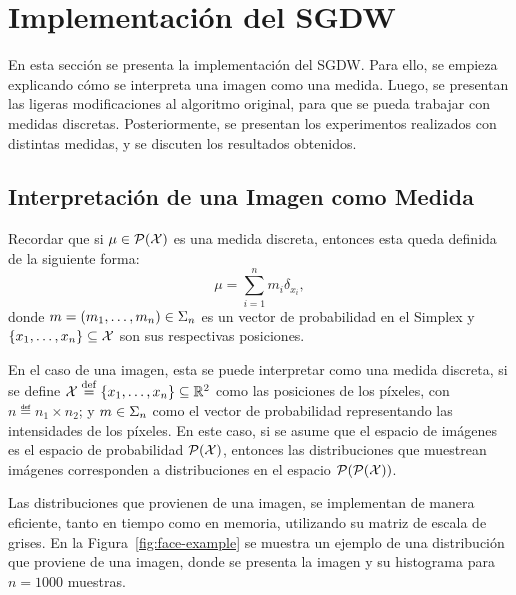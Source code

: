 \section{Implementación del SGDW}\label{sec:sgdw}  %

En esta sección se presenta la implementación del SGDW. Para ello, se empieza explicando cómo se interpreta una imagen como una medida. Luego, se presentan las ligeras modificaciones al algoritmo original, para que se pueda trabajar con medidas discretas. Posteriormente, se presentan los experimentos realizados con distintas medidas, y se discuten los resultados obtenidos.

\subsection{Interpretación de una Imagen como Medida}\label{ssec:interpr-imagen-medida}  %

Recordar que si $\mu\in \ProbSpace[\cX] $ es una medida discreta, entonces esta queda definida de la siguiente forma:
\begin{equation}\label{eq:medida-discreta}
    \mu = \sum_{i=1}^{n} m_i \delta_{x_i},
\end{equation}
donde $m = (m_1, \dots, m_n) \in \Simplex[n]$ es un vector de probabilidad en el Simplex y $ \left\{ x_1, \dots, x_n \right\} \subseteq \cX $ son sus respectivas posiciones.

En el caso de una imagen, esta se puede interpretar como una medida discreta, si se define $\cX \eqdef \left\{ x_1, \dots, x_n \right\} \subseteq \R^2$ como las posiciones de los píxeles, con $n \eqdef n_1 \times n_2$; y $m \in \Simplex[n]$ como el vector de probabilidad representando las intensidades de los píxeles. En este caso, si se asume que el espacio de imágenes es el espacio de probabilidad $\ProbSpace[\cX] $, entonces las distribuciones que muestrean imágenes corresponden a distribuciones en el espacio $\ProbSpace[\ProbSpace[\cX] ] $.

Las distribuciones que provienen de una imagen, se implementan de manera eficiente, tanto en tiempo como en memoria, utilizando su matriz de escala de grises. En la Figura~\ref{fig:face-example} se muestra un ejemplo de una distribución que proviene de una imagen, donde se presenta la imagen y su histograma para $n=1000$ muestras.

